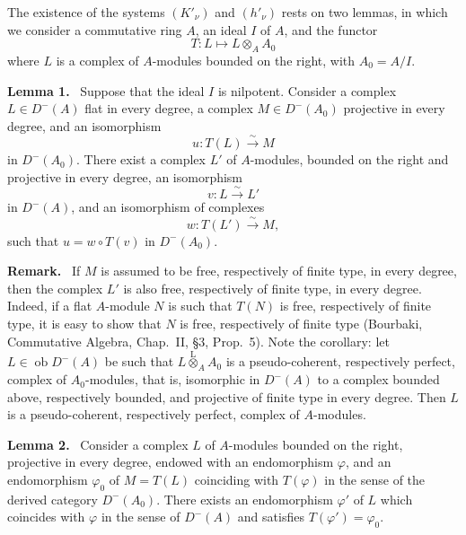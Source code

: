 \documentclass[11pt]{article}
\newenvironment{statement}[1]{\par\medskip\noindent\textbf{#1.}\ }{\par\medskip}
\providecommand{\lten}{\overset{\mathrm L}{\otimes}}
\providecommand{\Ob}{\operatorname{ob}}
\providecommand{\lten}{\overset{\mathrm L}{\otimes}}
\providecommand{\lten}{\overset{\mathrm L}{\otimes}}
\providecommand{\Ob}{\operatorname{ob}}
\providecommand{\lten}{\overset{\mathrm L}{\otimes}}
\providecommand{\lten}{\overset{\mathrm L}{\otimes}}
\providecommand{\Ob}{\operatorname{Ob}}
\providecommand{\lten}{\overset{\mathrm L}{\otimes}}
\providecommand{\Ob}{\operatorname{ob}}
\providecommand{\Ob}{\operatorname{Ob}}
\providecommand{\lten}{\overset{\mathrm L}{\otimes}}
\begin{document}
The existence of the systems $(K'_\nu)$ and $(h'_\nu)$ rests on two lemmas, in which we consider a commutative ring $A$, an ideal $I$ of $A$, and the functor
\[
T:L\longmapsto L\otimes_A A_0
\]
where $L$ is a complex of $A$-modules bounded on the right, with $A_0=A/I$.

\label{sga5:XV:lemma:1:2}\begin{statement}{Lemma 1}
Suppose that the ideal $I$ is nilpotent. Consider a complex $L\in D^-(A)$ flat in every degree, a complex $M\in D^-(A_0)$ projective in every degree, and an isomorphism
\[
u:T(L)\xrightarrow{\sim}M
\]
in $D^-(A_0)$. There exist a complex $L'$ of $A$-modules, bounded on the right and projective in every degree, an isomorphism
\[
v:L\xrightarrow{\sim}L'
\]
in $D^-(A)$, and an isomorphism of complexes
\[
w:T(L')\xrightarrow{\sim}M,
\]
such that $u=w\circ T(v)$ in $D^-(A_0)$.
\end{statement}

\begin{statement}{Remark}
If $M$ is assumed to be free, respectively of finite type, in every degree, then the complex $L'$ is also free, respectively of finite type, in every degree. Indeed, if a flat $A$-module $N$ is such that $T(N)$ is free, respectively of finite type, it is easy to show that $N$ is free, respectively of finite type (Bourbaki, Commutative Algebra, Chap.~II, §3, Prop.~5). Note the corollary: let $L\in\Ob D^-(A)$ be such that $L\lten_A A_0$ is a pseudo-coherent, respectively perfect, complex of $A_0$-modules, that is, isomorphic in $D^-(A)$ to a complex bounded above, respectively bounded, and projective of finite type in every degree. Then $L$ is a pseudo-coherent, respectively perfect, complex of $A$-modules.
\end{statement}

\label{sga5:XV:lemma:2:2}\begin{statement}{Lemma 2}
Consider a complex $L$ of $A$-modules bounded on the right, projective in every degree, endowed with an endomorphism $\varphi$, and an endomorphism $\varphi_0$ of $M=T(L)$ coinciding with $T(\varphi)$ in the sense of the derived category $D^-(A_0)$. There exists an endomorphism $\varphi'$ of $L$ which coincides with $\varphi$ in the sense of $D^-(A)$ and satisfies $T(\varphi')=\varphi_0$.
\end{statement}
\end{document}
